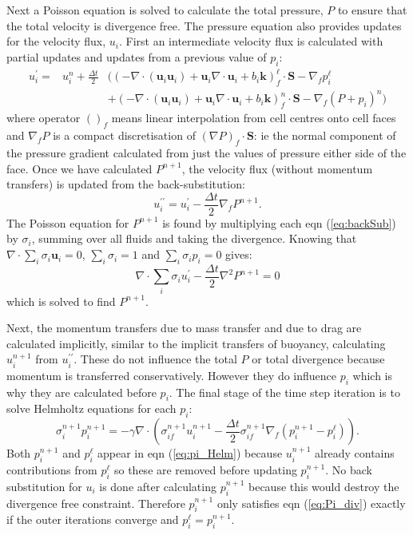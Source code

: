 \documentclass[draft]{agujournal2019}
\begin{document}
Next a Poisson equation is solved to calculate the total pressure,
$P$ to ensure that the total velocity is divergence free. The pressure
equation also provides updates for the velocity flux, $u_{i}$. First
an intermediate velocity flux is calculated with partial updates and
updates from a previous value of $p_{i}$:
\begin{eqnarray}
u_{i}^{\prime}= & u_{i}^{n}+\frac{\Delta t}{2} & \biggl(\left(-\nabla\cdot(\mathbf{u}_{i}\mathbf{u}_{i})+\mathbf{u}_{i}\nabla\cdot\mathbf{u}_{i}+b_{i}\mathbf{k}\right)_{f}^{\ell}\cdot\mathbf{S}-\nabla_{f}p_{i}^{\ell}\\
 &  & +\left(-\nabla\cdot(\mathbf{u}_{i}\mathbf{u}_{i})+\mathbf{u}_{i}\nabla\cdot\mathbf{u}_{i}+b_{i}\mathbf{k}\right)_{f}^{n}\cdot\mathbf{S}-\nabla_{f}(P+p_{i})^{n}\biggr)
\end{eqnarray}
where operator $()_{f}$ means linear interpolation from cell centres
onto cell faces and $\nabla_{f}P$ is a compact discretisation of
$(\nabla P)_{f}\cdot\mathbf{S}$: ie the normal component of the pressure
gradient calculated from just the values of pressure either side of
the face. Once we have calculated $P^{n+1}$, the velocity flux (without
momentum transfers) is updated from the back-substitution:
\begin{equation}
u_{i}^{\prime\prime}=u_{i}^{\prime}-\frac{\Delta t}{2}\nabla_{f}P^{n+1}.\label{eq:backSub}
\end{equation}
The Poisson equation for $P^{n+1}$ is found by multiplying each eqn
(\ref{eq:backSub}) by $\sigma_{i}$, summing over all fluids and
taking the divergence. Knowing that $\nabla\cdot\sum_{i}\sigma_{i}\mathbf{u}_{i}=0$,
$\sum_{i}\sigma_{i}=1$ and $\sum_{i}\sigma_{i}p_{i}=0$ gives:
\begin{equation}
\nabla\cdot\sum_{i}\sigma_{i}u_{i}^{\prime}-\frac{\Delta t}{2}\nabla^{2}P^{n+1}=0
\end{equation}
which is solved to find $P^{n+1}$. 

Next, the momentum transfers due to mass transfer and due to drag
are calculated implicitly, similar to the implicit transfers of buoyancy,
calculating $u_{i}^{n+1}$ from $u_{i}^{\prime\prime}$. These do
not influence the total $P$ or total divergence because momentum
is transferred conservatively. However they do influence $p_{i}$
which is why they are calculated before $p_{i}$. The final stage
of the time step iteration is to solve Helmholtz equations for each
$p_{i}$:
\begin{equation}
\sigma_{i}^{n+1}p_{i}^{n+1}=-\gamma\nabla\cdot\left(\sigma_{if}^{n+1}u_{i}^{n+1}-\frac{\Delta t}{2}\sigma_{if}^{n+1}\nabla_{f}\left(p_{i}^{n+1}-p_{i}^{\ell}\right)\right).\label{eq:pi_Helm}
\end{equation}
Both $p_{i}^{n+1}$ and $p_{i}^{\ell}$ appear in eqn (\ref{eq:pi_Helm})
because $u_{i}^{n+1}$ already contains contributions from $p_{i}^{\ell}$
so these are removed before updating $p_{i}^{n+1}$. No back substitution
for $u_{i}$ is done after calculating $p_{i}^{n+1}$ because this
would destroy the divergence free constraint. Therefore $p_{i}^{n+1}$
only satisfies eqn (\ref{eq:Pi_div}) exactly if the outer iterations
converge and $p_{i}^{\ell}=p_{i}^{n+1}$. 
\end{document}
